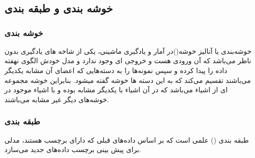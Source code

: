 \chapter{}
\section{خوشه بندی و طبقه بندی}
\subsection{خوشه بندی}

خوشه‌بندی یا آنالیز خوشه()در آمار و یادگیری ماشینی، یکی از شاخه های یادگیری بدون ناظر می‌باشد که آن ورودی هست و خروجی ای وجود ندارد و مدل خودش الگوی نهفته داده را پیدا کرده و سپس نمونه‌ها را به دسته‌هایی که اعضای آن مشابه یکدیگر می‌باشند تقسیم می‌کند که به این دسته ها خوشه گفته میشود. بنابراین خوشه مجموعه ای از اشیاء می‌باشد که در آن اشیاء با یکدیگر مشابه بوده و با اشیاء موجود در خوشه‌های دیگر غیر مشابه می‌باشند.

\subsection{طبقه بندی}

طبقه‌ بندی () علمی است که بر اساس داده‌های قبلی که دارای برچسب هستند، مدلی برای پیش بینی برچسب داده‌های جدید می‌سازد.


